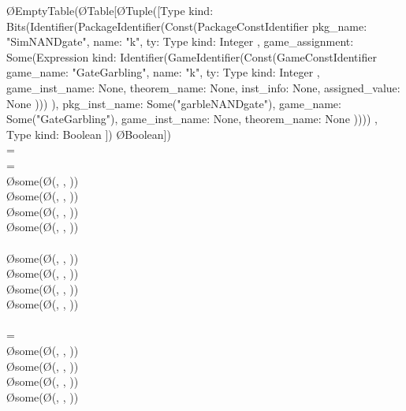 {  \gets \O{EmptyTable}(\O{Table}[\O{Tuple([Type { kind: Bits(Identifier(PackageIdentifier(Const(PackageConstIdentifier { pkg_name: "SimNANDgate", name: "k", ty: Type { kind: Integer }, game_assignment: Some(Expression { kind: Identifier(GameIdentifier(Const(GameConstIdentifier { game_name: "GateGarbling", name: "k", ty: Type { kind: Integer }, game_inst_name: None, theorem_name: None, inst_info: None, assigned_value: None }))) }), pkg_inst_name: Some("garbleNANDgate"), game_name: Some("GateGarbling"), game_inst_name: None, theorem_name: None })))) }, Type { kind: Boolean }])} \rightarrow \O{Boolean}])\\
\pcif {} =  \pcthen\\
\pcind\pcif {} =  \pcthen\\
\pcind\pcind {}\left[0\right] \gets \O{some}\left(\O{}(, , )\right)\\
\pcind\pcind {}\left[1\right] \gets \O{some}\left(\O{}(, , )\right)\\
\pcind\pcind {}\left[2\right] \gets \O{some}\left(\O{}(, , )\right)\\
\pcind\pcind {}\left[3\right] \gets \O{some}\left(\O{}(, , )\right)\\
\pcind\pcelse\\
\pcind\pcind {}\left[0\right] \gets \O{some}\left(\O{}(, , )\right)\\
\pcind\pcind {}\left[1\right] \gets \O{some}\left(\O{}(, , )\right)\\
\pcind\pcind {}\left[2\right] \gets \O{some}\left(\O{}(, , )\right)\\
\pcind\pcind {}\left[3\right] \gets \O{some}\left(\O{}(, , )\right)\\
\pcelse\\
\pcind\pcif {} =  \pcthen\\
\pcind\pcind {}\left[0\right] \gets \O{some}\left(\O{}(, , )\right)\\
\pcind\pcind {}\left[1\right] \gets \O{some}\left(\O{}(, , )\right)\\
\pcind\pcind {}\left[2\right] \gets \O{some}\left(\O{}(, , )\right)\\
\pcind\pcind {}\left[3\right] \gets \O{some}\left(\O{}(, , )\right)\\
}
